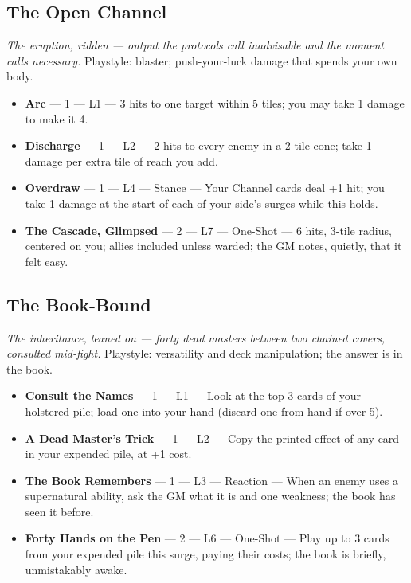 \subsection{The Open Channel}
\textit{The eruption, ridden --- output the protocols call inadvisable and the moment calls necessary.} Playstyle: blaster; push-your-luck damage that spends your own body.
\begin{itemize}
    \item \textbf{Arc} --- 1 --- L1 --- 3 hits to one target within 5 tiles; you may take 1 damage to make it 4.
    \item \textbf{Discharge} --- 1 --- L2 --- 2 hits to every enemy in a 2-tile cone; take 1 damage per extra tile of reach you add.
    \item \textbf{Overdraw} --- 1 --- L4 --- Stance --- Your Channel cards deal +1 hit; you take 1 damage at the start of each of your side's surges while this holds.
    \item \textbf{The Cascade, Glimpsed} --- 2 --- L7 --- One-Shot --- 6 hits, 3-tile radius, centered on you; allies included unless warded; the GM notes, quietly, that it felt easy.
\end{itemize}

\subsection{The Book-Bound}
\textit{The inheritance, leaned on --- forty dead masters between two chained covers, consulted mid-fight.} Playstyle: versatility and deck manipulation; the answer is in the book.
\begin{itemize}
    \item \textbf{Consult the Names} --- 1 --- L1 --- Look at the top 3 cards of your holstered pile; load one into your hand (discard one from hand if over 5).
    \item \textbf{A Dead Master's Trick} --- 1 --- L2 --- Copy the printed effect of any card in your expended pile, at +1 cost.
    \item \textbf{The Book Remembers} --- 1 --- L3 --- Reaction --- When an enemy uses a supernatural ability, ask the GM what it is and one weakness; the book has seen it before.
    \item \textbf{Forty Hands on the Pen} --- 2 --- L6 --- One-Shot --- Play up to 3 cards from your expended pile this surge, paying their costs; the book is briefly, unmistakably awake.
\end{itemize}

